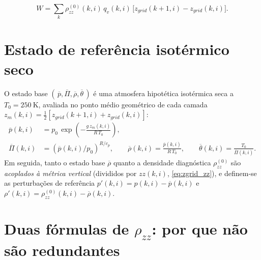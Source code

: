 \begin{equation}
  W = \sum_{k} \rho_{zz}^{(0)}(k,i)\, q_v(k,i)\, \big[z_{grid}(k{+}1,i)-z_{grid}(k,i)\big].
  \label{eq:precipitavel}
\end{equation}

\section{Estado de referência isotérmico seco}

O estado base $(\,\overline{p},\overline{\Pi},\overline{\rho},\overline{\theta}\,)$
é uma atmosfera hipotética isotérmica seca a $T_0=\SI{250}{\kelvin}$,
avaliada no ponto médio geométrico de cada camada $z_m(k,i) =
\tfrac12[z_{grid}(k{+}1,i)+z_{grid}(k,i)]$:
\begin{align}
  \overline{p}(k,i) &= p_0\, \exp\!\left(-\frac{g\, z_m(k,i)}{R\,T_0}\right), \label{eq:estado_base_p}\\
  \overline{\Pi}(k,i) &= \left(\overline{p}(k,i)/p_0\right)^{R/c_p},
  \qquad
  \overline{\rho}(k,i) = \frac{\overline{p}(k,i)}{R\,T_0},
  \qquad
  \overline{\theta}(k,i) = \frac{T_0}{\overline{\Pi}(k,i)}. \label{eq:estado_base_resto}
\end{align}
Em seguida, tanto o estado base $\overline{\rho}$ quanto a densidade
diagnóstica $\rho_{zz}^{(0)}$ são \emph{acoplados à métrica vertical}
(divididos por $zz(k,i)$, \cref{eq:zgrid_zz}), e definem-se as
perturbações de referência
$p'(k,i) = p(k,i) - \overline{p}(k,i)$ e
$\rho'(k,i) = \rho_{zz}^{(0)}(k,i) - \overline{\rho}(k,i)$.

\section{Duas fórmulas de $\rho_{zz}$: por que não são redundantes}
\label{sec:duas_formulas}

